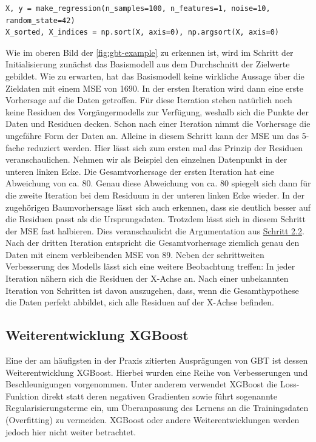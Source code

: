 \begin{verbatim}
X, y = make_regression(n_samples=100, n_features=1, noise=10, random_state=42)
X_sorted, X_indices = np.sort(X, axis=0), np.argsort(X, axis=0)
\end{verbatim}
Wie im oberen Bild der \autoref{fig:gbt-example} zu erkennen ist, wird im Schritt der Initialisierung zunächst das Basismodell aus dem Durchschnitt der Zielwerte gebildet. Wie zu erwarten, hat das Basismodell keine wirkliche Aussage über die Zieldaten mit einem MSE von 1690.
\newline
\newline
In der ersten Iteration wird dann eine erste Vorhersage auf die Daten getroffen. Für diese Iteration stehen natürlich noch keine Residuen des Vorgängermodells zur Verfügung, weshalb sich die Punkte der Daten und Residuen decken. Schon nach einer Iteration nimmt die Vorhersage die ungefähre Form der Daten an. Alleine in diesem Schritt kann der MSE um das 5-fache reduziert werden.
\newline
Hier lässt sich zum ersten mal das Prinzip der Residuen veranschaulichen. Nehmen wir als Beispiel den einzelnen Datenpunkt in der unteren linken Ecke. Die Gesamtvorhersage der ersten Iteration hat eine Abweichung von ca. 80. Genau diese Abweichung von ca. 80 spiegelt sich dann für die zweite Iteration bei dem Residuum in der unteren linken Ecke wieder. In der zugehörigen Baumvorhersage lässt sich auch erkennen, dass sie deutlich besser auf die Residuen passt als die Ursprungsdaten. Trotzdem lässt sich in diesem Schritt der MSE fast halbieren. Dies veranschaulicht die Argumentation aus \hyperref[para:GBT_training_tree]{Schritt 2.2}.
\newline
\newline
Nach der dritten Iteration entspricht die Gesamtvorhersage ziemlich genau den Daten mit einem verbleibenden MSE von 89. Neben der schrittweiten Verbesserung des Modells lässt sich eine weitere Beobachtung treffen: In jeder Iteration nähern sich die Residuen der X-Achse an. Nach einer unbekannten Iteration von Schritten ist davon auszugehen, dass, wenn die Gesamthypothese die Daten perfekt abbildet, sich alle Residuen auf der X-Achse befinden.

\subsection{ Weiterentwicklung XGBoost}
Eine der am häufigsten in der Praxis zitierten Ausprägungen von GBT ist dessen Weiterentwicklung XGBoost. Hierbei wurden eine Reihe von Verbesserungen und Beschleunigungen vorgenommen.
\newline
Unter anderem verwendet XGBoost die Loss-Funktion direkt statt deren negativen Gradienten sowie führt sogenannte Regularisierungsterme ein, um Überanpassung des Lernens an die Trainingsdaten (Overfitting) zu vermeiden.
XGBoost oder andere Weiterentwicklungen werden jedoch hier nicht weiter betrachtet.

